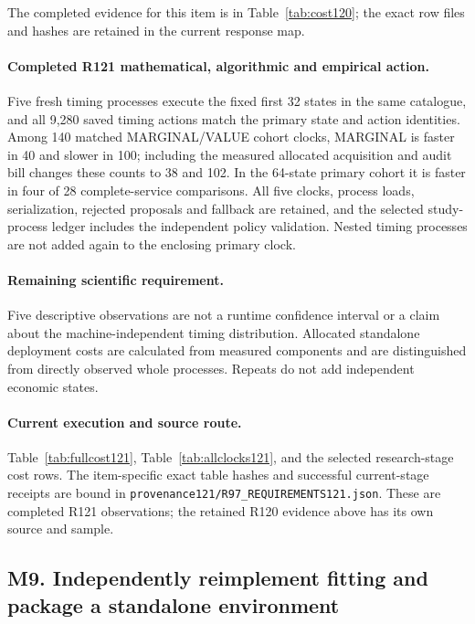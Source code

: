 The completed evidence for this item is in Table~\ref{tab:cost120}; the exact row files and hashes are retained in the current response map.

\paragraph{Completed R121 mathematical, algorithmic and empirical action.}
Five fresh timing processes execute the fixed first 32 states in the same catalogue, and all 9,280 saved timing actions match the primary state and action identities. Among 140 matched MARGINAL/VALUE cohort clocks, MARGINAL is faster in 40 and slower in 100; including the measured allocated acquisition and audit bill changes these counts to 38 and 102. In the 64-state primary cohort it is faster in four of 28 complete-service comparisons. All five clocks, process loads, serialization, rejected proposals and fallback are retained, and the selected study-process ledger includes the independent policy validation. Nested timing processes are not added again to the enclosing primary clock.

\paragraph{Remaining scientific requirement.}
Five descriptive observations are not a runtime confidence interval or a claim about the machine-independent timing distribution. Allocated standalone deployment costs are calculated from measured components and are distinguished from directly observed whole processes. Repeats do not add independent economic states.

\paragraph{Current execution and source route.}
Table~\ref{tab:fullcost121}, Table~\ref{tab:allclocks121}, and the selected research-stage cost rows.
The item-specific exact table hashes and successful current-stage receipts are bound in \nolinkurl{provenance121/R97_REQUIREMENTS121.json}. These are completed R121 observations; the retained R120 evidence above has its own source and sample.

\subsection{M9. Independently reimplement fitting and package a standalone environment}
\label{response121:M9}

